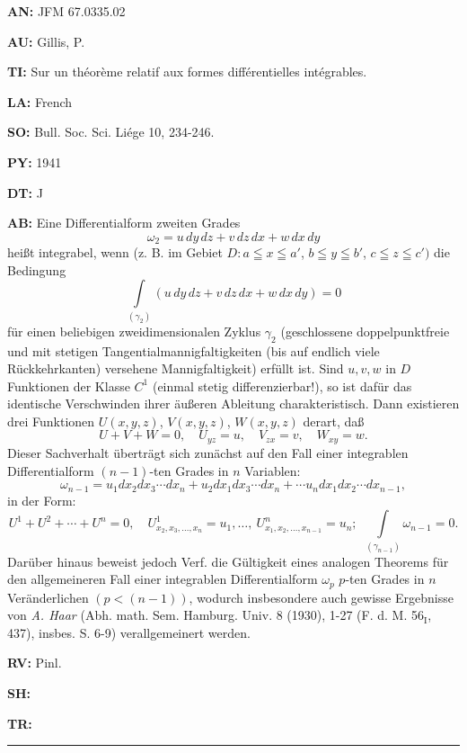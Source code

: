 \item{\bf AN:} JFM 67.0335.02
\item{\bf AU:} Gillis, P.
\item{\bf TI:} Sur un th\'eor\`eme relatif aux formes diff\'erentielles int\'egrables.
\item{\bf LA:} French
\item{\bf SO:} Bull. Soc. Sci. Li\'ege 10, 234-246.
\item{\bf PY:} 1941
\item{\bf DT:} J
\item{\bf AB:}{\parindent15pt
 Eine Differentialform zweiten Grades
$$
\omega_2 = u\,dy\,dz + v\,dz\,dx + w\,dx\,dy
$$
hei{\ss}t integrabel,
wenn (z. B. im Gebiet $D: a \leqq x \leqq a'$,
$b \leqq y \leqq b'$, $c \leqq z \leqq c') $
die Bedingung
$$
\int\limits_{(\gamma_2)} (u\,dy\,dz + v\,dz\,dx + w\,dx\,dy) = 0
$$
f\"ur einen beliebigen
zweidimensionalen Zyklus $\gamma_2$ (geschlossene doppelpunktfreie und
mit stetigen Tangentialmannigfaltigkeiten
(bis auf endlich viele R\"uckkehrkanten)
versehene Mannigfaltigkeit)
erf\"ullt ist. Sind $u, v, w$ in $D$ Funktionen der Klasse $C^1$
(einmal stetig differenzierbar!),
so ist daf\"ur das identische Verschwinden ihrer
\"au{\ss}eren
Ableitung charakteristisch.
Dann existieren drei Funktionen $U(x, y, z)$, $V (x, y, z)$,
$W(x,y,z)$ derart, da{\ss}
$$
U+V+W=0,\quad U_{yz}=u,\quad V_{zx} = v,\quad W_{xy} = w.
$$
Dieser Sachverhalt \"ubertr\"agt sich zun\"achst auf den Fall einer integrablen
Differentialform $(n- 1)$-ten Grades in $n$ Variablen:
$$
\omega_{n-1}=u_1dx_2dx_3\cdots dx_n+u_2dx_1dx_3\cdots dx_n+\cdots u_ndx_1dx_2\cdots dx_{n-1},
$$
in der Form:
$$
U^1+U^2 +\cdots + U^n=0,\quad U_{x_2, x_3, \ldots , x_n}^1
=u_1,\ldots, \ U^n_{x_1, x_2, \ldots , x_{n-1}}=u_n; \ \ \int\limits_{(\gamma_{n-1})} \omega _{n-1}=0.
$$
Dar\"uber hinaus beweist
jedoch Verf. die G\"ultigkeit eines analogen Theorems f\"ur
den
allgemeineren Fall einer integrablen Differentialform $\omega_p$ $p$-ten
Grades in $n$
Ver\"anderlichen $(p< (n - 1))$, wodurch
insbesondere auch gewisse Ergebnisse von
{\it A. Haar}
(Abh. math. Sem. Hamburg.
Univ. 8 (1930), 1-27 (F. d. M. 56$_{\text{I}}$, 437), insbes. S. 6-9)
verallgemeinert werden.
}
\item{\bf RV:} Pinl.
\item{\bf SH:}
\item{\bf TR:}

\bigskip\par\noindent\hrule\bigskip\par

